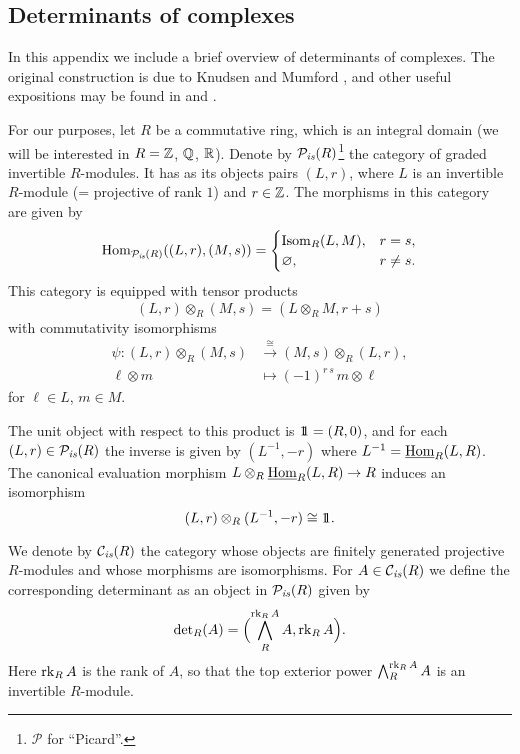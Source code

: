 \documentclass{article}
\numberwithin{equation}{section}
\begin{document}
\begin{appendices}
\section{Determinants of complexes}
\label{app:determinants}

In this appendix we include a brief overview of determinants of complexes.
The original construction is due to Knudsen and Mumford
\cite{Knudsen-Mumford-1976}, and other useful expositions may be found in
\cite[Appendix~A]{Gelfand-Kapranov-Zelevinsky-1994} and
\cite[\S 2.1]{Kato-1993}.

For our purposes, let $R$ be a commutative ring, which is an integral domain
(we will be interested in $R = \mathbb{Z}$, $\mathbb{Q}$, $\mathbb{R}$). Denote by
$\mathcal{P}_{\text{\it is}} (R)$\footnote{$\mathcal{P}$ for ``Picard''.} the category of
graded invertible $R$-modules. It has as its objects pairs $(L,r)$, where $L$ is
an invertible $R$-module (= projective of rank $1$) and $r \in \mathbb{Z}$. The
morphisms in this category are given by
\[ \operatorname{Hom}_{\mathcal{P}_{\text{\it is}} (R)} ((L,r), (M,s)) = \begin{cases}
    \operatorname{Isom}_R (L,M), & r = s, \\
    \varnothing, & r \ne s.
  \end{cases} \]
This category is equipped with tensor products
$$(L,r) \otimes_R (M,s) = (L\otimes_R M, r + s)$$
with commutativity isomorphisms
\begin{align*}
  \psi\colon (L,r) \otimes_R (M,s) & \xrightarrow{\cong}
                                     (M,s) \otimes_R (L,r), \\
  \ell \otimes m & \mapsto (-1)^{r\,s}\,m\otimes \ell
\end{align*}
for $\ell \in L$, $m \in M$.

The unit object with respect to this product is $1\!\!1 = (R,0)$, and for each
$(L,r) \in \mathcal{P}_{\text{\it is}} (R)$ the inverse is given by $(L^{-1}, -r)$ where
$L^{-1} = \underline{\operatorname{Hom}}_R (L,R)$. The canonical evaluation morphism
$L \otimes_R \underline{\operatorname{Hom}}_R (L,R) \to R$ induces an isomorphism
$$(L,r) \otimes_R (L^{-1}, -r) \cong 1\!\!1.$$

\begin{definition}
  \label{dfn:determinant-of-projective-fg-module}
  We denote by $\mathcal{C}_{\text{\it is}} (R)$ the category whose objects are finitely
  generated projective $R$-modules and whose morphisms are isomorphisms.  For
  $A \in \mathcal{C}_{\text{\it is}} (R)$ we define the corresponding determinant as an
  object in $\mathcal{P}_{\text{\it is}} (R)$ given by
  $$\operatorname{det}_R (A) = \Bigl(\bigwedge^{\operatorname{rk}_R A}_R A, \operatorname{rk}_R A\Bigr).$$
  Here $\operatorname{rk}_R A$ is the rank of $A$, so that the top exterior power
  $\bigwedge^{\operatorname{rk}_R A}_R A$ is an invertible $R$-module.
\end{definition}


\end{appendices}
\end{document}
